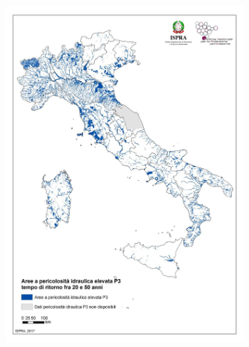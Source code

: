 \begin{figure}
    \centering
    \begin{subfigure}{.475\textwidth}
        \caption{}\label{fig:ispra_ita_flood/a}
        \includegraphics[width=\textwidth]{figures/ita_flood/p3}
    \end{subfigure}
    \begin{subfigure}{.475\textwidth}
        \caption{}\label{fig:ispra_ita_flood/b}

\end{subfigure}
\end{figure}
